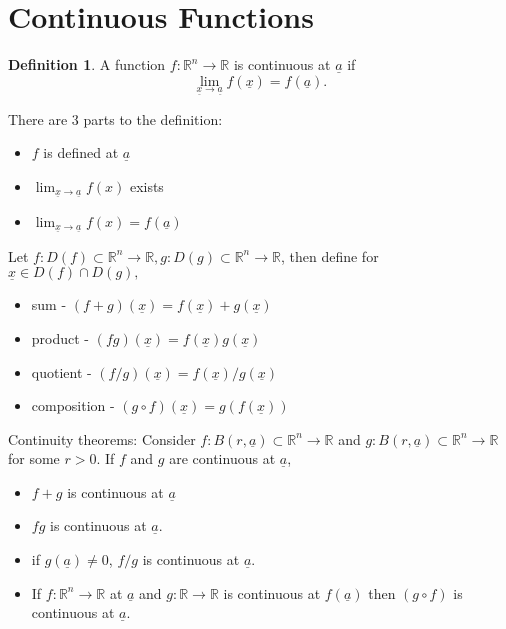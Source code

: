 \documentclass[12pt]{article}
\theoremstyle{definition}
\newtheorem{definition}{Definition}[section]
\newcommand{\R}{\mathbb{R}}
\begin{document}
\section{Continuous Functions}
\begin{definition}
    A function $f:\R^n\to\R$ is continuous at $\underline a$ if \[\lim_{\underline x\to \underline a}f(\underline x)=f(\underline a).\]
\end{definition}
There are 3 parts to the definition:
\begin{itemize}
    \item $f$ is defined at $\underline a$
    \item $\lim_{\underline x\to\underline a}f(x)$ exists
    \item $\lim_{\underline x\to\underline a}f(x)=f(\underline a)$
\end{itemize}
Let $f:D(f)\subset \R^n\to\R, g:D(g)\subset\R^n\to \R$, then define for $\underline x\in D(f)\cap D(g),$
\begin{itemize}
    \item sum - $(f+g)(\underline x)=f(\underline x)+g(\underline x)$
    \item product - $(fg)(\underline x)=f(\underline x)g(\underline x)$
    \item quotient - $(f/g)(\underline x)=f(\underline x)/g(\underline x)$
    \item composition - $(g\circ f)(\underline x)=g(f(\underline x))$
\end{itemize}
Continuity theorems: Consider $f:B(r,\underline a)\subset \R^n\to \R$ and $g:B(r,\underline a)\subset \R^n\to\R$ for some $r>0$. If $f$ and $g$ are continuous at $\underline a$,
\begin{itemize}
    \item $f+g$ is continuous at $\underline a$
    \item $fg$ is continuous at $\underline a$.
    \item if $g(\underline a)\neq 0$, $f/g$ is continuous at $\underline a$.
    \item If $f:\R^n\to\R$ at $\underline a$ and $g:\R\to\R$ is continuous at $f(\underline a)$ then $(g\circ f)$ is continuous at $\underline a$.
\end{itemize}
\end{document}
